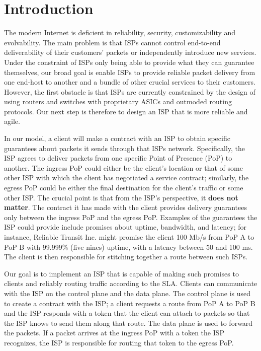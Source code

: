 \documentclass{article}
\begin{document}
\section{Introduction}

The modern Internet is deficient in reliability, security,
customizability and evolvability. The main problem is that ISPs cannot
control end-to-end deliverability of their customers' packets or
independently introduce new services. Under the constraint of ISPs
only being able to provide what they can guarantee themselves, our
broad goal is enable ISPs to provide reliable packet delivery from one
end-host to another and a bundle of other crucial services to their
customers. However, the first obstacle is that ISPs are currently
constrained by the design of using routers and switches with
proprietary ASICs and outmoded routing protocols. Our next step is
therefore to design an ISP that is more reliable and agile.

In our model, a client will make a contract with an ISP to obtain
specific guarantees about packets it sends through that ISPs
network. Specifically, the ISP agrees to deliver packets from one
specific Point of Presence (PoP) to another. The ingress PoP could
either be the client's location or that of some other ISP with which
the client has negotiated a service contract; similarly, the egress PoP
could be either the final destination for the client's traffic or some
other ISP. The crucial point is that from the ISP's perspective, it
\textbf{does not matter}. The contract it has made with the client
provides delivery guarantees only between the ingress PoP and the
egress PoP. Examples of the guarantees the ISP could provide include
promises about uptime, bandwidth, and latency; for instance, Reliable
Transit Inc. might promise the client 100 Mb/s from PoP A to PoP B
with 99.999\% (five nines) uptime, with a latency between 50 and 100 ms. The client
is then responsible for stitching together a route between such ISPs.

Our goal is to implement an ISP that is capable of making such
promises to clients and reliably routing traffic according to the SLA. Clients can
communicate with the ISP on the control plane and the data plane. The
control plane is used to create a contract with the ISP; a client
requests a route from PoP A to PoP B and the ISP responds with a token
that the client can attach to packets so that the ISP knows to send
them along that route. The data plane is used to forward the
packets. If a packet arrives at the ingress PoP with a token the ISP
recognizes, the ISP is responsible for routing that token to the
egress PoP.
\end{document}

